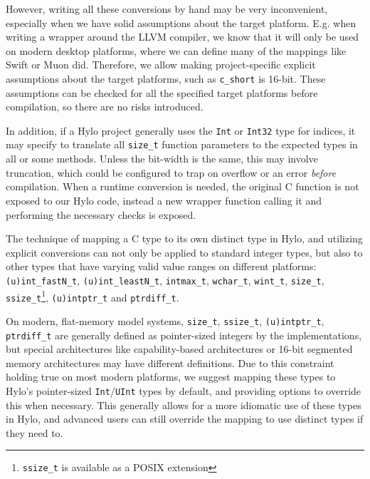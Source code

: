 However, writing all these conversions by hand may be very inconvenient, especially when we have solid assumptions about the target platform. E.g. when writing a wrapper around the LLVM compiler, we know that it will only be used on modern desktop platforms, where we can define many of the mappings like Swift or Muon did. Therefore, we allow making project-specific explicit assumptions about the target platforms, such as \texttt{c\_short} is 16-bit. These assumptions can be checked for all the specified target platforms before compilation, so there are no risks introduced.

In addition, if a Hylo project generally uses the \texttt{Int} or \texttt{Int32} type for indices, it may specify to translate all \texttt{size\_t} function parameters to the expected types in all or some methods. Unless the bit-width is the same, this may involve truncation, which could be configured to trap on overflow or an error \emph{before} compilation. When a runtime conversion is needed, the original C function is not exposed to our Hylo code, instead a new wrapper function calling it and performing the necessary checks is exposed.

The technique of mapping a C type to its own distinct type in Hylo, and utilizing explicit conversions can not only be applied to standard integer types, but also to other types that have varying valid value ranges on different platforms: \texttt{(u)int\_fastN\_t}, \texttt{(u)int\_leastN\_t}, \texttt{intmax\_t}, \texttt{wchar\_t}, \texttt{wint\_t}, \texttt{size\_t}, \texttt{ssize\_t}\footnote{\texttt{ssize\_t} is available as a POSIX extension}, \texttt{(u)intptr\_t} and \texttt{ptrdiff\_t}.

On modern, flat-memory model systems, \texttt{size\_t}, \texttt{ssize\_t}, \texttt{(u)intptr\_t}, \texttt{ptrdiff\_t} are generally defined as pointer-sized integers by the implementations, but special architectures like capability-based architectures\cite{cheri-intro}\cite{hackernews-rust-cheri} or 16-bit segmented memory architectures\cite{arch16-bit} may have different definitions. Due to this constraint holding true on most modern platforms, we suggest mapping these types to Hylo's pointer-sized \texttt{Int}/\texttt{UInt} types by default, and providing options to override this when necessary. This generally allows for a more idiomatic use of these types in Hylo, and advanced users can still override the mapping to use distinct types if they need to.

